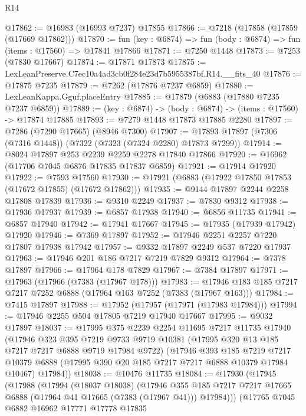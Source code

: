 \begin{lexlean}{R14}
\begin{coremodule}
@17862 := @16983 (@16993 @7237) @17855
@17866 := @7218 (@17858 (@17859 (@17669 @17862)))
@17870 := fun (key : @6874) => fun (body : @6874) => fun (items : @17560) => @17841 @17866
@17871 := @7250 @1448
@17873 := @7253 (@7830 @17667)
@17874 := @17871 @17873
@17875 := LexLeanPreserve.C7ec10a4ad3cb0f284e23d7b5955387bf.R14.__fits_40
@17876 := @17875 @7235
@17879 := @7262 (@17876 @7237 @6859)
@17880 := LexLeanKappa.Gguf.placeEntry
@17885 := @17879 (@6883 (@17880 @7235 @7237 @6859))
@17889 := (key : @6874) -> (body : @6874) -> (items : @17560) -> @17874 @17885
@17893 := @7279 @1448 @17873 @17885 @2280
@17897 := @7286 (@7290 @17665) (@8946 @7300)
@17907 := @17893 @17897 (@7306 (@7316 @1448)) (@7322 (@7323 (@7324 @2280) @17873 @7299))
@17914 := @8024 @17897 @253 @2239 @2259 @2278 @17840 @17866
@17920 := @16962 (@17706 @7045 @6876 @17835 @17837 @6859)
@17921 := @17914 @17920
@17922 := @7593 @17560
@17930 := @17921 (@6883 (@17922 @17850 @17853 (@17672 @17855) (@17672 @17862)))
@17935 := @9144 @17897 @2244 @2258 @17808 @17839
@17936 := @9310 @2249
@17937 := @7830 @9312
@17938 := @17936 @17937
@17939 := @6857 @17938
@17940 := @6856 @11735
@17941 := @6857 @17940
@17942 := @17941 @17667
@17945 := @17935 (@17939 @17942) @17920
@17946 := @7369 @17897
@17952 := @17946 @2251 @2257 @7220 @17807 @17938 @17942
@17957 := @9332 @17897 @2249 @537 @7220 @17937
@17963 := @17946 @201 @186 @7217 @7219 @7829 @9312
@17964 := @7378 @17897
@17966 := @17964 @178 @7829
@17967 := @7384 @17897
@17971 := @17963 (@17966 (@7383 (@17967 @178)))
@17983 := @17946 @183 @185 @7217 @7217 @7252 @6888 (@17964 @163 @7252 (@7383 (@17967 @163)))
@17984 := @7415 @17897
@17988 := @17952 (@17957 (@17971 (@17983 @17984)))
@17994 := @17946 @2255 @504 @17805 @7219 @17940 @17667
@17995 := @9032 @17897
@18037 := @17995
    @375
    @2239
    @2254
    @11695
    @7217
    @11735
    @17940
    (@17946
      @323
      @395
      @7219
      @9733
      @9719
      @10381
      (@17995 @320 @13 @185 @7217 @7217 @6888 @9719 @17984 @9722)
      (@17946
        @393
        @185
        @7219
        @7217
        @10379
        @6888
        (@17995 @390 @20 @185 @7217 @7217 @6888 @10379 @17984 @10467)
        @17984))
@18038 := @10476 @11735
@18084 := @17930
    (@17945
      (@17988
        (@17994
          (@18037 @18038)
          (@17946
            @355
            @185
            @7217
            @7217
            @17665
            @6888
            (@17964 @41 @17665 (@7383 (@17967 @41)))
            @17984)))
      (@17765
        @7045
        @6882
        @16962
        @17771
        @17778
        @17835

\end{coremodule}
\end{lexlean}
